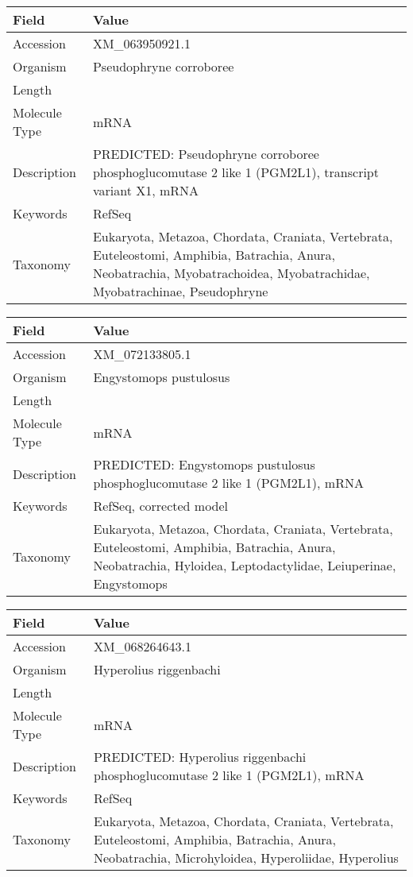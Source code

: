 \documentclass[10pt]{article}
\begin{document}
\vspace{1em}
{\footnotesize
\begin{longtable}{>{\raggedright\arraybackslash}p{4.5cm} >{\raggedright\arraybackslash}p{11.5cm}}
\textbf{Field} & \textbf{Value} \\
\hline
Accession & XM\_063950921.1 \\
Organism & Pseudophryne corroboree \\
Length & 7603 \\
Molecule Type & mRNA \\
Description & PREDICTED: Pseudophryne corroboree phosphoglucomutase 2 like 1 (PGM2L1), transcript variant X1, mRNA \\
Keywords & RefSeq \\
Taxonomy & Eukaryota, Metazoa, Chordata, Craniata, Vertebrata, Euteleostomi, Amphibia, Batrachia, Anura, Neobatrachia, Myobatrachoidea, Myobatrachidae, Myobatrachinae, Pseudophryne \\
\end{longtable}
}

\vspace{1em}
{\footnotesize
\begin{longtable}{>{\raggedright\arraybackslash}p{4.5cm} >{\raggedright\arraybackslash}p{11.5cm}}
\textbf{Field} & \textbf{Value} \\
\hline
Accession & XM\_072133805.1 \\
Organism & Engystomops pustulosus \\
Length & 7004 \\
Molecule Type & mRNA \\
Description & PREDICTED: Engystomops pustulosus phosphoglucomutase 2 like 1 (PGM2L1), mRNA \\
Keywords & RefSeq, corrected model \\
Taxonomy & Eukaryota, Metazoa, Chordata, Craniata, Vertebrata, Euteleostomi, Amphibia, Batrachia, Anura, Neobatrachia, Hyloidea, Leptodactylidae, Leiuperinae, Engystomops \\
\end{longtable}
}

\vspace{1em}
{\footnotesize
\begin{longtable}{>{\raggedright\arraybackslash}p{4.5cm} >{\raggedright\arraybackslash}p{11.5cm}}
\textbf{Field} & \textbf{Value} \\
\hline
Accession & XM\_068264643.1 \\
Organism & Hyperolius riggenbachi \\
Length & 3385 \\
Molecule Type & mRNA \\
Description & PREDICTED: Hyperolius riggenbachi phosphoglucomutase 2 like 1 (PGM2L1), mRNA \\
Keywords & RefSeq \\
Taxonomy & Eukaryota, Metazoa, Chordata, Craniata, Vertebrata, Euteleostomi, Amphibia, Batrachia, Anura, Neobatrachia, Microhyloidea, Hyperoliidae, Hyperolius \\
\end{longtable}
}
\end{document}
